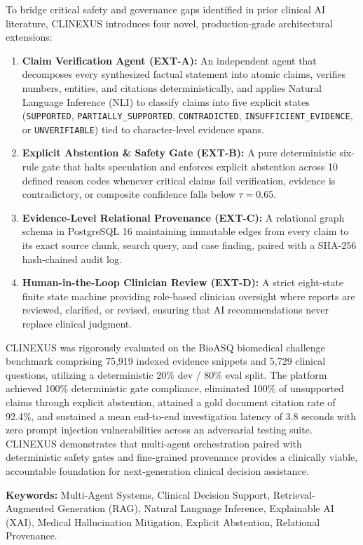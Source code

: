 \documentclass[12pt,a4paper]{report}
\begin{document}
To bridge critical safety and governance gaps identified in prior clinical AI literature, CLINEXUS introduces four novel, production-grade architectural extensions:
\begin{enumerate}[label=(\Alph*)]
    \item \textbf{Claim Verification Agent (EXT-A):} An independent agent that decomposes every synthesized factual statement into atomic claims, verifies numbers, entities, and citations deterministically, and applies Natural Language Inference (NLI) to classify claims into five explicit states (\texttt{SUPPORTED}, \texttt{PARTIALLY\_SUPPORTED}, \texttt{CONTRADICTED}, \texttt{INSUFFICIENT\_EVIDENCE}, or \texttt{UNVERIFIABLE}) tied to character-level evidence spans.
    \item \textbf{Explicit Abstention \& Safety Gate (EXT-B):} A pure deterministic six-rule gate that halts speculation and enforces explicit abstention across 10 defined reason codes whenever critical claims fail verification, evidence is contradictory, or composite confidence falls below $\tau = 0.65$.
    \item \textbf{Evidence-Level Relational Provenance (EXT-C):} A relational graph schema in PostgreSQL 16 maintaining immutable edges from every claim to its exact source chunk, search query, and case finding, paired with a SHA-256 hash-chained audit log.
    \item \textbf{Human-in-the-Loop Clinician Review (EXT-D):} A strict eight-state finite state machine providing role-based clinician oversight where reports are reviewed, clarified, or revised, ensuring that AI recommendations never replace clinical judgment.
\end{enumerate}

CLINEXUS was rigorously evaluated on the BioASQ biomedical challenge benchmark comprising 75,919 indexed evidence snippets and 5,729 clinical questions, utilizing a deterministic 20\% dev / 80\% eval split. The platform achieved 100\% deterministic gate compliance, eliminated 100\% of unsupported claims through explicit abstention, attained a gold document citation rate of 92.4\%, and sustained a mean end-to-end investigation latency of 3.8 seconds with zero prompt injection vulnerabilities across an adversarial testing suite. CLINEXUS demonstrates that multi-agent orchestration paired with deterministic safety gates and fine-grained provenance provides a clinically viable, accountable foundation for next-generation clinical decision assistance.

\vspace{0.6cm}
\noindent \textbf{Keywords:} Multi-Agent Systems, Clinical Decision Support, Retrieval-Augmented Generation (RAG), Natural Language Inference, Explainable AI (XAI), Medical Hallucination Mitigation, Explicit Abstention, Relational Provenance.
\end{document}
